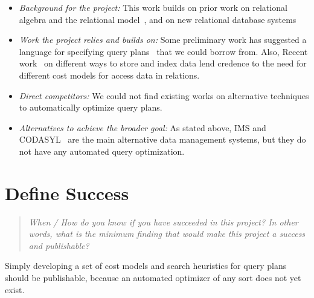 \documentclass{proc}
\begin{document}
\begin{itemize}
\item \emph{Background for the project:} This work builds on prior work on relational algebra and the relational model~\cite{codd1970relational}, and on new relational database systems~\cite{stonebraker1976design,astrahan1976system}

\item \emph{Work the project relies and builds on: } Some preliminary work has suggested a language for specifying query plans~\cite{lorie1979access} that we could borrow from.  Also, Recent work~\cite{bayer2002organization} on different ways to store and index data lend credence to the need for different cost models for access data in relations.

\item \emph{Direct competitors: } We could not find existing works on alternative techniques to automatically optimize query plans.

\item \emph{Alternatives to achieve the broader goal: } As stated above, IMS and CODASYL~\cite{taylor1976codasyl} are the main alternative data management systems, but they do not have any automated query optimization.

 \end{itemize}


\section{Define Success}
\begin{quote}
\emph{When / How do you know if you have succeeded in this project?
In other words, what is the minimum finding that would make this project a success and publishable?}
\end{quote}

Simply developing a set of cost models and search heuristics for query plans should be publishable, because an automated optimizer of any sort does not yet exist.  



\end{document}
